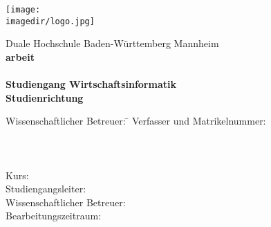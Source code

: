 \begin{titlepage}
\begin{minipage}{\textwidth}
		\vspace{-2cm}
		\noindent \hfill \texttt{[image: \\imagedir/logo.jpg]}
\end{minipage}
\vspace{1em}
\begin{center}
	{\textsf{\large Duale Hochschule Baden-W\"urttemberg Mannheim}}\\[4em]
	{\textsf{\textbf{\large{\DieArtDerArbeit}arbeit}}}\\[6mm]
	{\textsf{\textbf{\Large{}\DerTitelDerArbeit}}} \\[1.5cm]
	{\textsf{\textbf{\large{}Studiengang Wirtschaftsinformatik}}\\[6mm]
	\textsf{\textbf{Studienrichtung \DieStudienrichtung}}}\vspace{10em}
	
	\begin{minipage}{\textwidth}
		\begin{tabbing}
		Wissenschaftlicher Betreuer: \hspace{0.85cm}\=\kill
		Verfasser und Matrikelnummer: \> \DerAutorDerArbeitEins \\[1.5mm]
		\> \DerAutorDerArbeitZwei \\[1.5mm]
		\> \DerAutorDerArbeitDrei \\[1.5mm]
		\> \DerAutorDerArbeitVier \\[1.5mm]
		Kurs: \> \DieKursbezeichnung \\[1.5mm]
		Studiengangsleiter: \> \DerStudiengangsleiter \\[1.5mm]
		Wissenschaftlicher Betreuer: \> \DerWissBetreuer \\[1.5mm]
		Bearbeitungszeitraum: \> \DerBearbeitungszeitraum\\[1.5mm]
		\end{tabbing}
	\end{minipage}
\end{center}
\end{titlepage}